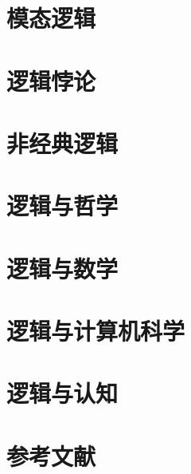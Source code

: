 \documentclass[a4paper,11pt,twoside]{book}
\begin{document}
\chapter{模态逻辑}
 
 







\chapter{逻辑悖论}





\chapter{非经典逻辑}







\chapter{逻辑与哲学}




\chapter{逻辑与数学}




\chapter{逻辑与计算机科学}








\chapter{逻辑与认知}








\backmatter
\chapter*{参考文献}
\end{document}
